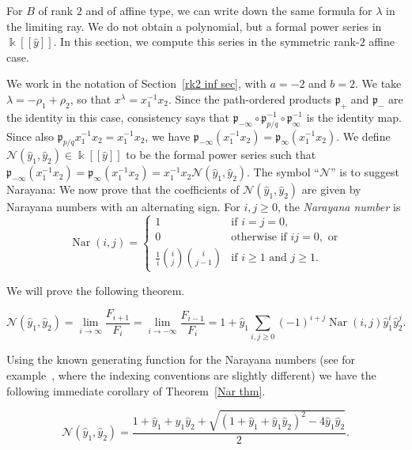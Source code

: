 \documentclass[ALCO,ThmDefs,Unicode,epreuves]{cedram}
\DeclareMathOperator{\Nar}{Nar}
\newcommand{\newword}[1]{\emph{#1}}
\newcommand\llbracket{[\![}
\newcommand\rrbracket{]\!]}
\newcommand{\N}{{\mathcal N}}
\newcommand{\p}{{\mathfrak p}}
\renewcommand{\k}{\Bbbk}
\newcommand{\hy}{\hat{y}}
\begin{document}
For $B$ of rank $2$ and of affine type, we can write down the same formula for $\lambda$ in the limiting ray.
We do not obtain a polynomial, but a formal power series in $\k\llbracket \hy\rrbracket $.
In this section, we compute this series in the symmetric rank-$2$ affine case.

We work in the notation of Section~\ref{rk2 inf sec}, with $a=-2$ and $b=2$.
We take $\lambda=-\rho_1+\rho_2$, so that $x^\lambda=x_1^{-1}x_2$.
Since the path-ordered products $\p_+$ and $\p_-$ are the identity in this case, consistency says that $\p_{-\infty}\circ\p_{p/q}^{-1}\circ\p_\infty^{-1}$ is the identity map.
Since also $\p_{p/q}x_1^{-1}x_2=x_1^{-1}x_2$, we have $\p_{-\infty}(x_1^{-1}x_2)=\p_\infty(x_1^{-1}x_2)$.
We define $\N(\hy_1,\hy_2)\in\k\llbracket \hy\rrbracket $ to be the formal power series such that $\p_{-\infty}(x_1^{-1}x_2)=\p_\infty(x_1^{-1}x_2)=x_1^{-1}x_2\N(\hy_1,\hy_2)$.
The symbol ``$\N$\hspace{0.7pt}'' is to suggest Narayana: We now prove that the coefficients of $\N(\hy_1,\hy_2)$ are given by Narayana numbers with an alternating sign.
For $i,j\ge 0$, the \newword{Narayana number} is 
\begin{equation}\label{Nar def}
\Nar(i,j)=\begin{cases}
1&\text{if }i=j=0,\\
0&\text{otherwise if }ij=0,\text{ or}\\
\frac1i\binom ij\binom i{j-1}&\text{if }i\ge1\text{ and }j\ge1.
\end{cases}
\end{equation}

We will prove the following theorem.

\begin{theorem}\label{Nar thm}
\begin{equation}\label{Nar thm eq}
\N(\hy_1,\hy_2)=\lim_{i\to\infty}\frac{F_{i+1}}{F_i}=\lim_{i\to-\infty}\frac{F_{i-1}}{F_i}=1+\hy_1\sum_{i,j\ge0}(-1)^{i+j}\Nar(i,j)\hy_1^i\hy_2^j.
\end{equation}
\end{theorem}

Using the known generating function for the Narayana numbers (see for example~\cite[Chapter~2]{PetersenBook}, where the indexing conventions are slightly different) we have the following immediate corollary of Theorem~\ref{Nar thm}.

\begin{coro}\label{Nar cor}
\begin{equation}\label{Nar cor eq}
\N(\hy_1,\hy_2)=\frac{1+\hy_1+\hy_1\hy_2+\sqrt{(1+\hy_1+\hy_1\hy_2)^2-4\hy_1\hy_2}}{2}.
\end{equation}
\end{coro}
\end{document}
